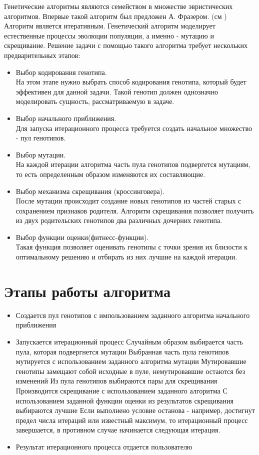 Генетические алгоритмы являются семейством в множестве эвристических алгоритмов. Впервые такой алгоритм был предложен А. Фразером. (см \cite{Фразер1970})
Алгоритм является итеративным.
Генетический алгоритм моделирует естественные процессы эволюции популяции, а именно - мутацию и скрещивание.
Решение задачи с помощью такого алгоритма требует нескольких предварительных этапов:
\begin{itemize}
	\item Выбор кодирования генотипа.\\
На этом этапе нужно выбрать способ кодирования генотипа, который будет эффективен для данной задачи. Такой генотип должен однозначно моделировать сущность, рассматриваемую в задаче.
	\item Выбор начального приближения.\\
Для запуска итерационного процесса требуется создать начальное множество - пул генотипов.
	\item Выбор мутации.\\
На каждой итерации алгоритма часть пула генотипов подвергется мутациям, то есть определенным образом изменяются их составляющие.
	\item Выбор механизма скрещивания (кроссинговера).\\
После мутации происходит создание новых генотипов из частей старых с сохранением признаков родителя. Алгоритм скрещивания позволяет получить из двух родительских генотипов два различных дочерних генотипа.
	\item Выбор функции оценки(фитнесс-функции).\\
Такая функция позволяет оценивать генотипы с точки зрения их близости к оптимальному решению и отбирать из них лучшие на каждой итерации.
\end{itemize}
\section{Этапы работы алгоритма}%
\begin{itemize}%
\item Создается пул генотипов с импользованием заданного алгоритма начального приближения
\item Запускается итерационный процесс
	\subitem Случайным образом выбирается часть пула, которая подвергнется мутации
	\subitem Выбранная часть пула генотипов мутируется с использованием заданного алгоритма мутации
	\subitem Мутировавшие генотипы замещают собой исходные в пуле, немутировавшие остаются без изменений
	\subitem Из пула генотипов выбираются пары для скрещивания
	\subitem Производится скрещивание с использованием заданного алгоритма
	\subitem С использованием заданной функции оценки из результатов скрещивания выбираются лучшие 
	\subitem Если выполнено условие останова - например, достигнут предел числа итераций или известный максимум, то итерационный процесс завершается, в противном случае  начинается следующая итерация.
\item Результат итерационного процесса отдается пользователю
\end{itemize}
